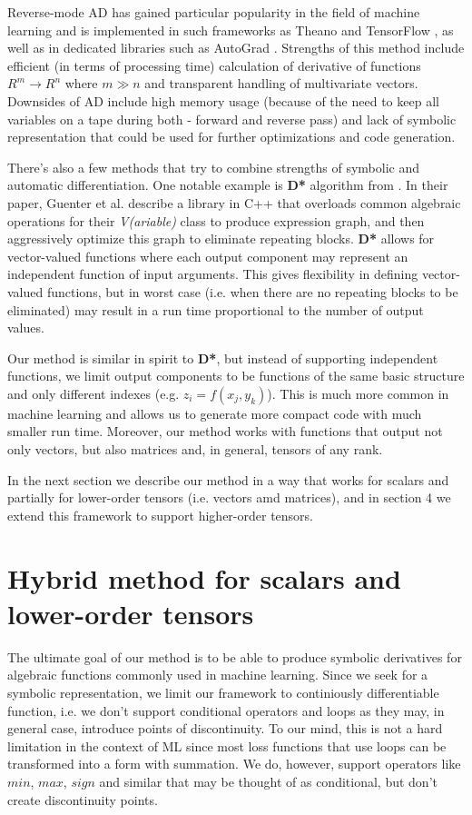 \documentclass[conference]{IEEEtran}
\begin{document}
Reverse-mode AD has gained particular popularity in the field of machine learning and is implemented in such frameworks as Theano \cite{Theano} and TensorFlow \cite{TensorFlow}, as well as in dedicated libraries such as AutoGrad \cite{AutoGrad}. Strengths of this method include efficient (in terms of processing time) calculation of derivative of functions $R^m \to R^n$ where $m \gg n$ and transparent handling of multivariate vectors. Downsides of AD include high memory usage (because of the need to keep all variables on a tape during both - forward and reverse pass) and lack of symbolic representation that could be used for further optimizations and code generation. 

There's also a few methods that try to combine strengths of symbolic and automatic differentiation. One notable example is \textbf{D*} algorithm from \cite{guenter2007}. In their paper, Guenter et al. describe a library in C++ that overloads common algebraic operations for their \textit{V(ariable)} class to produce expression graph, and then aggressively optimize this graph to eliminate repeating blocks. \textbf{D*} allows for vector-valued functions where each output component may represent an independent function of input arguments. This gives flexibility in defining vector-valued functions, but in worst case (i.e. when there are no repeating blocks to be eliminated) may result in a run time proportional to the number of output values. 

Our method is similar in spirit to \textbf{D*}, but instead of supporting independent functions, we limit output components to be functions of the same basic structure and only different indexes (e.g. $z_i = f(x_j, y_k)$). This is much more common in machine learning and allows us to generate more compact code with much smaller run time. Moreover, our method works with functions that output not only vectors, but also matrices and, in general, tensors of any rank. 

In the next section we describe our method in a way that works for scalars and partially for lower-order tensors (i.e. vectors amd matrices), and in section 4 we extend this framework to support higher-order tensors.

\section{Hybrid method for scalars and lower-order tensors}

The ultimate goal of our method is to be able to produce symbolic derivatives for algebraic functions commonly used in machine learning. Since we seek for a symbolic representation, we limit our framework to continiously differentiable function, i.e. we don't support conditional operators and loops as they may, in general case, introduce points of discontinuity. To our mind, this is not a hard limitation in the context of ML since most loss functions that use loops can be transformed into a form with summation. We do, however, support operators like $min$, $max$, $sign$ and similar that may be thought of as conditional, but don't create discontinuity points.
\end{document}
